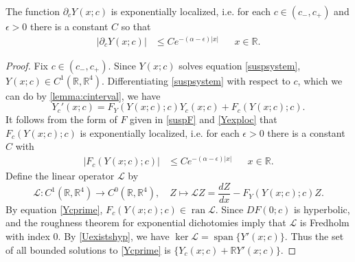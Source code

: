 \documentclass[review,onefignum,onetabnum]{siamart171218}
\newcommand{\R}{\mathbb{R}}
\def\ker{\mathop\mathrm{ker}\nolimits}
\def\Ran{\mathop\mathrm{ran}\nolimits}
\def\Span{\mathop\mathrm{span}\nolimits}
\newcommand{\calL}{\mathcal{L}}
\begin{document}
\begin{lemma}\label{lemma:Ycexploc}
The function $\partial_c Y(x; c)$ is exponentially localized, i.e. for each $c \in (c_-, c_+)$ and $\epsilon > 0$ there is a constant $C$ so that
\begin{align}\label{Ycexploc}
|\partial_c Y(x; c)| &\leq C e^{-(\alpha - \epsilon)|x|} && x \in \R.
\end{align}

\begin{proof}
Fix $c \in (c_-, c_+)$. Since $Y(x; c)$ solves equation \cref{suspsystem}, $Y(x; c) \in C^1(\R, \R^4)$. Differentiating \cref{suspsystem} with respect to $c$, which we can do by \cref{lemma:cinterval}, we have
\begin{equation}\label{Ycprime}
Y_c'(x; c) = F_Y(Y(x;c); c) Y_c(x; c) + F_c(Y(x;c); c).
\end{equation}
It follows from the form of $F$ given in \cref{suspF} and \cref{Yexploc} that $F_c(Y(x;c); c)$ is exponentially localized, i.e. for each $\epsilon > 0$ there is a constant $C$ with
\begin{align}\label{Fcexploc}
|F_c(Y(x;c); c)| &\leq C e^{-(\alpha - \epsilon)|x|} && x \in \R.
\end{align}
Define the linear operator $\calL$ by
\begin{equation}\label{suspdefL}
\calL: C^1(\R, \R^4) \to C^0(\R, \R^4),\quad
Z \mapsto \calL Z = \frac{dZ}{dx} - F_Y(Y(x;c); c) Z.
\end{equation}
By equation \cref{Ycprime}, $F_c(Y(x;c); c) \in \Ran \calL$. Since $DF(0; c)$ is hyperbolic, \cite[Lemma~4.2]{Palmer1984} and the roughness theorem for exponential dichotomies \cite{Coppel1978} imply that $\calL$ is Fredholm with index 0. By \cref{Uexistshyp}, we have $\ker \calL = \Span\{Y'(x; c)\}$. Thus the set of all bounded solutions to \cref{Ycprime} is $\{Y_c(x; c) + \R Y'(x; c)\}$.


\end{proof}
\end{lemma}
\end{document}
